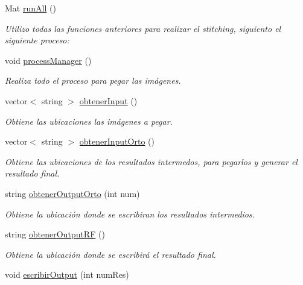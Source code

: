 \begin{DoxyCompactItemize}
Mat \mbox{\hyperlink{classuav_1_1Stitcher_a0b78aba00328166db74d46884485f3bd}{run\+All}} ()
\begin{DoxyCompactList}\small\item\em Utilizo todas las funciones anteriores para realizar el stitching, siguiento el siguiente proceso\+: \end{DoxyCompactList}\item 
\mbox{\label{classuav_1_1Stitcher_ac4616d6a6ed8e7aaf7b41464ed4b85d8}} 
void \mbox{\hyperlink{classuav_1_1Stitcher_ac4616d6a6ed8e7aaf7b41464ed4b85d8}{process\+Manager}} ()
\begin{DoxyCompactList}\small\item\em Realiza todo el proceso para pegar las imágenes. \end{DoxyCompactList}\item 
vector$<$ string $>$ \mbox{\hyperlink{classuav_1_1Stitcher_a33521f40ecd0a4b57e3433b32c33f872}{obtener\+Input}} ()
\begin{DoxyCompactList}\small\item\em Obtiene las ubicaciones las imágenes a pegar. \end{DoxyCompactList}\item 
vector$<$ string $>$ \mbox{\hyperlink{classuav_1_1Stitcher_a4a31cc35b3bc69697cdaa8094d4490b8}{obtener\+Input\+Orto}} ()
\begin{DoxyCompactList}\small\item\em Obtiene las ubicaciones de los resultados intermedos, para pegarlos y generar el resultado final. \end{DoxyCompactList}\item 
string \mbox{\hyperlink{classuav_1_1Stitcher_a2f5433b17c42c874359f7f92148b4ee2}{obtener\+Output\+Orto}} (int num)
\begin{DoxyCompactList}\small\item\em Obtiene la ubicación donde se escribiran los resultados intermedios. \end{DoxyCompactList}\item 
string \mbox{\hyperlink{classuav_1_1Stitcher_a5f6f8f09c80f39daf9f2ea34e0db91b9}{obtener\+Output\+RF}} ()
\begin{DoxyCompactList}\small\item\em Obtiene la ubicación donde se escribirá el resultado final. \end{DoxyCompactList}\item 
void \mbox{\hyperlink{classuav_1_1Stitcher_a079c00542221b0e2fc551d2e97df7b97}{escribir\+Output}} (int num\+Res)

\end{DoxyCompactItemize}
